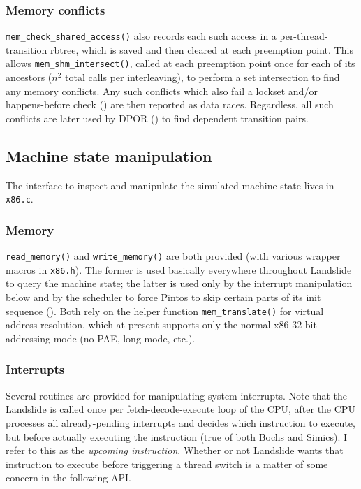 \subsubsection{Memory conflicts}

{\tt mem\_check\_shared\_access()} also records each such access in a per-thread-transition rbtree,
which is saved and then cleared at each preemption point.
This allows {\tt mem\_shm\_\allowbreak{}intersect()}, called at each preemption point once for each of its ancestors
($n^2$ total calls per interleaving),
to perform a set intersection to find any memory conflicts.
Any such conflicts which also fail a lockset
and/or happens-before check (\sect{\ref{sec:landslide-datarace}})
are then reported as data races.
Regardless, all such conflicts are later used by DPOR (\sect{\ref{sec:landslide-dpor}}) to find dependent transition pairs.


\subsection{Machine state manipulation}

The interface to inspect and manipulate the simulated machine state lives in {\tt x86.c}.

\subsubsection{Memory}

{\tt read\_memory()} and {\tt write\_memory()} are both provided (with various wrapper macros in {\tt x86.h}).
The former is used basically everywhere throughout Landslide to query the machine state;
the latter is used only by the interrupt manipulation below
and by the scheduler to force Pintos to skip certain parts of its init sequence (\sect{\ref{sec:landslide-pintosspecifics}}).
Both rely on the helper function {\tt mem\_translate()} for virtual address resolution,
which at present supports only the normal x86 32-bit addressing mode (no PAE, long mode, etc.).

\subsubsection{Interrupts}
\label{sec:landslide-interrupce}

Several routines are provided for manipulating system interrupts.
Note that the Landslide is called once per fetch-decode-execute loop of the CPU,
after the CPU processes all already-pending interrupts and decides which instruction to execute,
but before actually executing the instruction
(true of both Bochs and Simics).
I refer to this as the {\em upcoming instruction}.
Whether or not Landslide wants that instruction to execute before triggering a thread switch is a matter of some concern in the following API.


